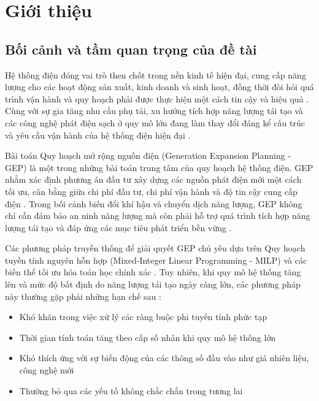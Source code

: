 \chapter{Giới thiệu}

\section{Bối cảnh và tầm quan trọng của đề tài}

Hệ thống điện đóng vai trò then chốt trong nền kinh tế hiện đại, cung cấp năng lượng cho các hoạt động sản xuất, kinh doanh và sinh hoạt, đồng thời đòi hỏi quá trình vận hành và quy hoạch phải được thực hiện một cách tin cậy và hiệu quả \cite{wood2013powersystems,koltsaklis2018gep}. Cùng với sự gia tăng nhu cầu phụ tải, xu hướng tích hợp năng lượng tái tạo và các công nghệ phát điện sạch ở quy mô lớn đang làm thay đổi đáng kể cấu trúc và yêu cầu vận hành của hệ thống điện hiện đại \cite{oree2017gep_review,nrel2024atb}.

Bài toán Quy hoạch mở rộng nguồn điện (Generation Expansion Planning - GEP) là một trong những bài toán trung tâm của quy hoạch hệ thống điện. GEP nhằm xác định phương án đầu tư xây dựng các nguồn phát điện mới một cách tối ưu, cân bằng giữa chi phí đầu tư, chi phí vận hành và độ tin cậy cung cấp điện \cite{koltsaklis2018gep,sadeghi2017gep_review}. Trong bối cảnh biến đổi khí hậu và chuyển dịch năng lượng, GEP không chỉ cần đảm bảo an ninh năng lượng mà còn phải hỗ trợ quá trình tích hợp năng lượng tái tạo và đáp ứng các mục tiêu phát triển bền vững \cite{oree2017gep_review}.

Các phương pháp truyền thống để giải quyết GEP chủ yếu dựa trên Quy hoạch tuyến tính nguyên hỗn hợp (Mixed-Integer Linear Programming - MILP) và các biến thể tối ưu hóa toán học chính xác \cite{koltsaklis2018gep,sadeghi2017gep_review}. Tuy nhiên, khi quy mô hệ thống tăng lên và mức độ bất định do năng lượng tái tạo ngày càng lớn, các phương pháp này thường gặp phải những hạn chế sau \cite{oree2017gep_review}:

\begin{itemize}
    \item Khó khăn trong việc xử lý các ràng buộc phi tuyến tính phức tạp
    \item Thời gian tính toán tăng theo cấp số nhân khi quy mô hệ thống lớn
    \item Khó thích ứng với sự biến động của các thông số đầu vào như giá nhiên liệu, công nghệ mới
    \item Thường bỏ qua các yếu tố không chắc chắn trong tương lai
\end{itemize}

